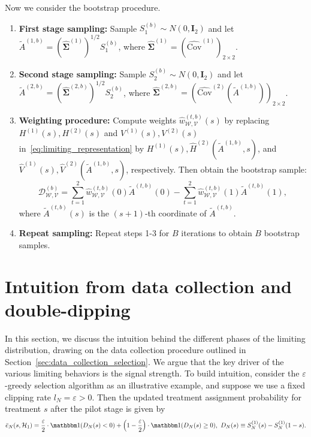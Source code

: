 \documentclass[12pt]{article}
\newcommand{\indicator}{\mathbbm 1}						%
\begin{document}
Now we consider the bootstrap procedure. 

\begin{enumerate}
	\item\textbf{First stage sampling:} Sample $S_1^{(b)} \sim N(0, \bm{I}_2)$ and let $\tilde{A}^{(1,b)} = (\hat{\bm{\Sigma}}^{(1)})^{1/2} S_1^{(b)}$, where $\hat{\bm{\Sigma}}^{(1)} = (\hat{\mathrm{Cov}}^{(1)})_{2 \times 2}$.
	\item \textbf{Second stage sampling:} Sample $S_2^{(b)} \sim N(0, \bm{I}_2)$ and let $\tilde{A}^{(2,b)} = (\hat{\bm{\Sigma}}^{(2,b)})^{1/2} S_2^{(b)}$, where $\hat{\bm{\Sigma}}^{(2,b)} = (\hat{\mathrm{Cov}}^{(2)}(\tilde{A}^{(1,b)}))_{2 \times 2}$.
	\item \textbf{Weighting procedure:} Compute weights $\hat{w}_{\mathcal{W},\mathcal{V}}^{(t,b)}(s)$ by replacing $H^{(1)}(s),H^{(2)}(s)$ and $V^{(1)}(s),V^{(2)}(s)$ in~\eqref{eq:limiting_representation} by $H^{(1)}(s),\hat{H}^{(2)}(\tilde{A}^{(1,b)},s)$, and $\hat{V}^{(1)}(s),\hat{V}^{(2)}(\tilde{A}^{(1,b)},s)$, respectively. Then obtain the bootstrap sample:
    \[
    \mathcal{D}_{\mathcal{W},\mathcal{V}}^{(b)} = \sum_{t=1}^2 \hat{w}_{\mathcal{W},\mathcal{V}}^{(t,b)}(0) \tilde{A}^{(t,b)}(0) - \sum_{t=1}^2 \hat{w}_{\mathcal{W},\mathcal{V}}^{(t,b)}(1) \tilde{A}^{(t,b)}(1),
    \]
	where $\tilde{A}^{(t,b)}(s)$ is the $(s+1)$-th coordinate of $\tilde{A}^{(t,b)}$.
	\item\textbf{Repeat sampling:} Repeat steps 1-3 for $B$ iterations to obtain $B$ bootstrap samples.
\end{enumerate}



\section{Intuition from data collection and double-dipping}\label{sec:intuition_limits}

In this section, we discuss the intuition behind the different phases of the limiting distribution, drawing on the data collection procedure outlined in Section~\ref{sec:data_collection_selection}. We argue that the key driver of the various limiting behaviors is the signal strength. To build intuition, consider the $\varepsilon$-greedy selection algorithm as an illustrative example, and suppose we use a fixed clipping rate $l_N = \varepsilon > 0$. Then the updated treatment assignment probability for treatment $s$ after the pilot stage is given by
\small
\[
\bar{e}_N(s, \mathcal{H}_{1}) = \frac{\varepsilon}{2} \cdot \indicator(D_N(s) < 0) + \left(1 - \frac{\varepsilon}{2} \right) \cdot \indicator(D_N(s) \geq 0),\ D_N(s) \equiv S_N^{(1)}(s) - S_N^{(1)}(1 - s).
\]
\normalsize
\end{document}

